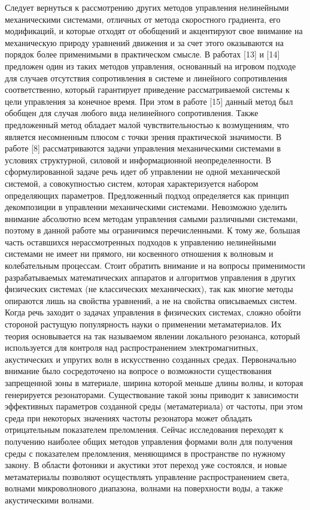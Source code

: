 Следует вернуться к рассмотрению других методов управления нелинейными механическими системами, отличных от метода скоростного градиента, его модификаций, и которые отходят от обобщений и акцентируют свое внимание на механическую природу уравнений движения и за счет этого оказываются на порядок более применимыми в практическом смысле.
В работах [13] и [14] предложен один из таких методов управления, основанный на игровом подходе для случаев отсутствия сопротивления в системе и линейного сопротивления соответственно, который гарантирует приведение рассматриваемой системы к цели управления за конечное время. При этом в работе [15] данный метод был обобщен для случая любого вида нелинейного сопротивления. Также предложенный метод обладает малой чувствительностью к возмущениям, что является несомненным плюсом с точки зрения практической значимости.
В работе [8] рассматриваются задачи управления механическими системами в условиях структурной, силовой и информационной неопределенности. В сформулированной задаче речь идет об управлении не одной механической системой, а совокупностью систем, которая характеризуется набором определяющих параметров. Предложенный подход определяется как принцип декомпозиции в управлении механическими системами.
Невозможно уделить внимание абсолютно всем методам управления самыми различными системами, поэтому в данной работе мы ограничимся перечисленными. К тому же, большая часть оставшихся нерассмотренных подходов к управлению нелинейными системами не имеет ни прямого, ни косвенного отношения к волновым и колебательным процессам.
Стоит обратить внимание и на вопросы применимости разрабатываемых математических аппаратов и алгоритмов управления в других физических системах (не классических механических), так как многие методы опираются лишь на свойства уравнений, а не на свойства описываемых систем. Когда речь заходит о задачах управления в физических системах, сложно обойти стороной растущую популярность науки о применении метаматериалов. Их теория основывается на так называемом явлении локального резонанса, который используется для контроля над распространением электромагнитных, акустических и упругих волн в искусственно созданных средах. 
Первоначально внимание было сосредоточено на вопросе о возможности существования запрещенной зоны в материале, ширина которой меньше длины волны, и которая генерируется резонаторами. Существование такой зоны приводит к зависимости эффективных параметров созданной среды (метаматериала) от частоты, при этом среда при некоторых значениях частоты резонатора может обладать отрицательным показателем преломления. Сейчас исследования переходят к получению наиболее общих методов управления формами волн для получения среды с показателем преломления, меняющимся в пространстве по нужному закону. В области фотоники и акустики этот переход уже состоялся, и новые метаматериалы позволяют осуществлять управление распространением света, волнами микроволнового диапазона, волнами на поверхности воды, а также акустическими волнами. 
